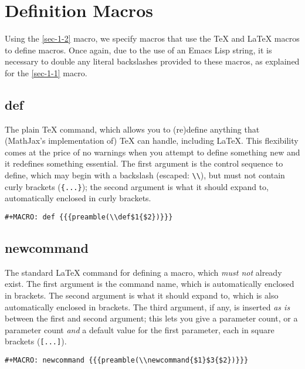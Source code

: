 \documentclass[11pt]{article}
\begin{document}
\section{Definition Macros}
\label{sec-2}

Using the \ref{sec-1-2} macro, we specify macros that use the \TeX{} and \LaTeX{}
macros to define macros.  Once again, due to the use of an Emacs Lisp
string, it is necessary to double any literal backslashes provided to
these macros, as explained for the \ref{sec-1-1} macro.

\subsection{def}
\label{sec-2-1}

The plain \TeX{} command, which allows you to (re)define anything that
(MathJax's implementation of) \TeX{} can handle, including \LaTeX{}.  This
flexibility comes at the price of no warnings when you attempt to
define something new and it redefines something essential.  The first
argument is the control sequence to define, which may begin with a
backslash (escaped: \verb~\\~), but must not contain curly brackets
(\verb~{...}~); the second argument is what it should expand to,
automatically enclosed in curly brackets.

\begin{verbatim}
#+MACRO: def {{{preamble(\\def$1{$2})}}}
\end{verbatim}

\subsection{newcommand}
\label{sec-2-2}

The standard \LaTeX{} command for defining a macro, which \emph{must not}
already exist.  The first argument is the command name, which is
automatically enclosed in brackets.  The second argument is what it
should expand to, which is also automatically enclosed in brackets.
The third argument, if any, is inserted \emph{as is} between the first and
second argument; this lets you give a parameter count, or a parameter
count \emph{and} a default value for the first parameter, each in square
brackets (\verb~[...]~).

\begin{verbatim}
#+MACRO: newcommand {{{preamble(\\newcommand{$1}$3{$2})}}}
\end{verbatim}
\end{document}
